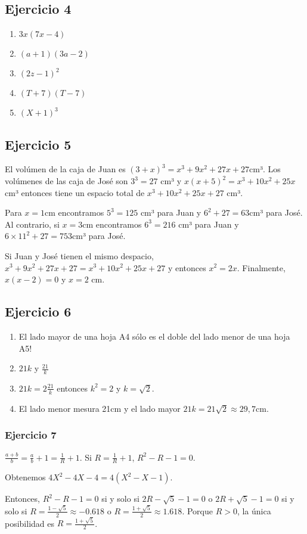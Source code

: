 \subsection*{Ejercicio 4}

\begin{enumerate}
\item $3x (7x - 4)$
\item $(a+1)(3a-2)$
\item $(2z-1)^2$
\item $(T+7)(T-7)$
\item $(X+1)^3$
\end{enumerate}

\subsection*{Ejercicio 5}

El volúmen de la caja de Juan es $(3+x)^3 = x^3+9x^2+27x+27$cm³. Los volúmenes
de las caja de José son $3^3=27$ cm³ y $x(x+5)^2 = x^3+10x^2+25x$ cm³ entonces
tiene un espacio total de $x^3+10x^2+25x + 27$ cm³.

Para $x=1$cm encontramos $5^3 = 125$ cm³ para Juan y $6^2 + 27 = 63$cm³ para
José. Al contrario, si $x=3$cm encontramos $6^3 = 216$ cm³ para Juan y
$6\times11^2 + 27 = 753$cm³ para José.

Si Juan y José tienen el mismo despacio,
$x^3+9x^2+27x+27 = x^3+10x^2+25x + 27$ y entonces
$x^2 = 2x$. Finalmente, $x(x-2) = 0$ y $x = 2$ cm.

\subsection*{Ejercicio 6}

\begin{enumerate}
\item El lado mayor de una hoja A4 sólo es el doble del lado menor de una hoja
      A5!
\item $21k$ y $\frac{21}{k}$
\item $21k = 2 \frac{21}{k}$ entonces $k^2 = 2$ y $k = \sqrt{2}$.
\item El lado menor mesura 21cm y el lado mayor
  $21k = 21\sqrt{2} \approx 29,7\text{cm}$.
\end{enumerate}

\subsubsection*{Ejercicio 7}

$\frac{a+b}{b} = \frac{a}{b} + 1  = \frac{1}{R} + 1$. Si
$R = \frac{1}{R} + 1$, $R^2 - R - 1 = 0$.

Obtenemos $4X^2-4X-4 = 4(X^2-X-1)$.

Entonces, $R^2 - R - 1 = 0$ si y solo si
$2R - \sqrt{5} - 1 = 0$ o $2R + \sqrt{5} - 1 = 0$ si y solo si
$R = \frac{1 - \sqrt{5}}{2} \approx -0.618$ o
$R = \frac{1 + \sqrt{5}}{2} \approx 1.618$. Porque $R > 0$, la
única posibilidad es $R = \frac{1 + \sqrt{5}}{2}$.

